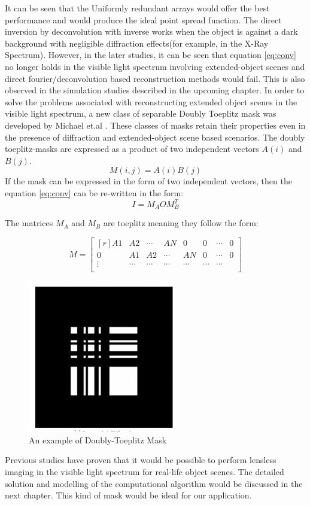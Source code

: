 It can be seen that the Uniformly redundant arrays would offer the best performance and would produce the ideal point spread function. The direct inversion by deconvolution with inverse works when the object is against a dark background with negligible diffraction effects(for example, in the X-Ray Spectrum). 
However, in the later studies\cite{Toeplitz}, it can be seen that equation \ref{eq:conv} no longer holds in the visible light spectrum involving extended-object scenes and direct fourier/deconvolution based reconstruction methods would fail. This is also observed in the simulation studies described in the upcoming chapter. In order to solve the problems associated with reconstructing extended object scenes in the visible light spectrum, a new class of separable Doubly Toeplitz mask was developed by Michael et.al \cite{Toeplitz}. These classes of masks retain their properties even in the presence of diffraction and extended-object scene based scenarios. The doubly toeplitz-masks are expressed as a product of two independent vectors $A(i)$ and $B(j)$.
\begin{equation}
M(i,j) = A(i)B(j)
\end{equation}
If the mask can be expressed in the form of two independent vectors, then the equation \ref{eq:conv} can be re-written in the form: 
\begin{equation}
I = M_AOM_B^T
\label{eq:separable}
\end{equation}

The matrices $M_A$ and $M_B$ are toeplitz meaning they follow the form:

\[ %
 M = 
 \begin{bmatrix*}[r]
    A1 & A2 & \cdots &AN & 0 &0 & \cdots & 0 \\
    0 & A1 & A2 & \cdots &AN & 0 & \cdots & 0\\
    \vdots &\cdots &\cdots &\cdots &\cdots&\cdots&\cdots \\
  \end{bmatrix*}
\]

\begin{figure}[ht]
\includegraphics[scale = 0.50]{pics/doubly-topelitz}
\caption{An example of Doubly-Toeplitz Mask\cite{Topelitz}}
\label{fig:doubly_toeplitz}
\end{figure}

Previous studies\cite{Toeplitz}\cite{VBoomi}\cite{Flatcam} have proven that it would be possible to perform lensless imaging  in the visible light spectrum for real-life object scenes. The detailed solution and modelling of the computational algorithm would be discussed in the next chapter. This kind of mask would be ideal for our application.
